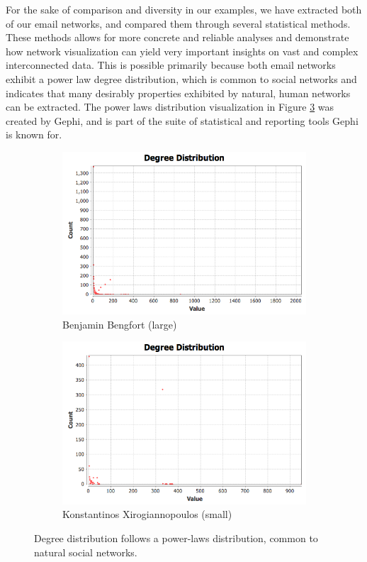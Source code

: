 \documentclass[11pt,letterpaper]{article}
\begin{document}
For the sake of comparison and diversity in our examples, we have extracted both of our email networks, and compared them through several statistical methods. These methods allows for more concrete and reliable analyses and demonstrate how network visualization can yield very important insights on vast and complex interconnected data. This is possible primarily because both email networks exhibit a power law degree distribution, which is common to social networks and indicates that many desirably properties exhibited by natural, human networks can be extracted. The power laws distribution visualization in Figure \ref{fig:degree} was created by Gephi, and is part of the suite of statistical and reporting tools Gephi is known for.

\begin{figure}[h]
	\centering
	\begin{subfigure}{0.49\textwidth}
		\centering
		\includegraphics[width=\textwidth]{figures/benjamin_degree.png}
		\caption{\textsf{Benjamin Bengfort (large)}}
        \label{fig:benjamin_degree}
	\end{subfigure} \hfill
	\begin{subfigure}{0.49\textwidth}
		\centering
		\includegraphics[width=\textwidth]{figures/kostas_degree.png}
		\caption{\textsf{Konstantinos Xirogiannopoulos (small)}}
        \label{fig:kostas_degree}
	\end{subfigure}
    \caption{\textsf{Degree distribution follows a power-laws distribution, common to natural social networks.}}
    \label{fig:degree}
\end{figure}
\end{document}
